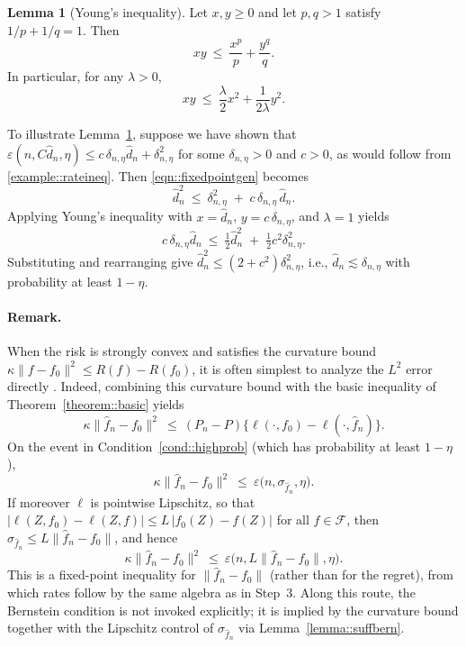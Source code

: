 \documentclass[11pt]{article}
\theoremstyle{plain}
\theoremstyle{definition} %
\newtheorem{lemma}{Lemma}
\begin{document}
\begin{lemma}[Young's inequality]
\label{lem:young}
Let \(x,y\ge 0\) and let \(p,q>1\) satisfy \(1/p+1/q=1\). Then
\[
xy \ \le\ \frac{x^p}{p}+\frac{y^q}{q}.
\]
In particular, for any \(\lambda>0\),
\[
xy \ \le\ \frac{\lambda}{2}x^2+\frac{1}{2\lambda}y^2.
\]
\end{lemma}


To illustrate Lemma~\ref{lem:young}, suppose we have shown that
\(\varepsilon(n,C\hat d_n,\eta)\le c\,\delta_{n,\eta}\hat d_n+\delta_{n,\eta}^2\)
for some \(\delta_{n,\eta}>0\) and \(c>0\), as would follow from \eqref{example::rateineq}. Then \eqref{eqn::fixedpointgen} becomes
\[
\hat d_n^2 \ \le\ \delta_{n,\eta}^2 \;+\; c\,\delta_{n,\eta}\,\hat d_n .
\]
Applying Young's inequality with \(x=\hat d_n\), \(y=c\,\delta_{n,\eta}\), and \(\lambda=1\) yields
\[
c\,\delta_{n,\eta}\hat d_n \ \le\ \tfrac12 \hat d_n^2 \;+\; \tfrac12 c^2\delta_{n,\eta}^2.
\]
Substituting and rearranging give \(\hat d_n^2 \le (2+c^2)\delta_{n,\eta}^2\), i.e.,
\(\hat d_n \lesssim \delta_{n,\eta}\) with probability at least $1 - \eta$.

\paragraph{Remark.}
When the risk is strongly convex and satisfies the curvature bound
\(\kappa\|f-f_0\|^2 \le R(f)-R(f_0)\), it is often simplest to analyze the
\(L^2\) error directly \citep{wainwright2019high}. Indeed, combining this
curvature bound with the basic inequality of Theorem~\ref{theorem::basic} yields
\[
\kappa\|\hat f_n-f_0\|^2
\ \le\
(P_n-P)\bigl\{\ell(\cdot,f_0)-\ell(\cdot,\hat f_n)\bigr\}.
\]
On the event in Condition~\ref{cond::highprob} (which has probability at least \(1-\eta\)),
\[
\kappa\|\hat f_n-f_0\|^2
\ \le\
\varepsilon\bigl(n,\sigma_{\hat f_n},\eta\bigr).
\]
If moreover \(\ell\) is pointwise Lipschitz, so that
\(|\ell(Z,f_0)-\ell(Z,f)|\le L\,|f_0(Z)-f(Z)|\) for all \(f\in\mathcal F\), then
\(\sigma_{\hat f_n}\le L\|\hat f_n-f_0\|\), and hence
\[
\kappa\|\hat f_n-f_0\|^2
\ \le\
\varepsilon\bigl(n,L\|\hat f_n-f_0\|,\eta\bigr).
\]
This is a fixed-point inequality for \(\|\hat f_n-f_0\|\) (rather than for the
regret), from which rates follow by the same algebra as in Step~3. Along this
route, the Bernstein condition is not invoked explicitly; it is implied by the
curvature bound together with the Lipschitz control of \(\sigma_{\hat f_n}\) via
Lemma~\ref{lemma::suffbern}.

 
\end{document}
